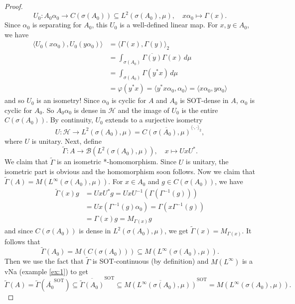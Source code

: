 \documentclass[10pt, a4paper]{article}
\newenvironment{noticeC}{%
  \tcolorbox[%
  notitle,
  empty,
  enhanced,  %
  breakable,
  coltext=black, 
  fontupper=\rmfamily,
  noparskip,
  sharp corners,
  boxrule=-1pt,  %
  frame hidden,
  left=7pt,  %
  right=7pt,
  top=5pt,
  bottom=5pt,
  before skip=2.5ex plus 2pt,
  after skip=2.5ex plus 2pt,
  overlay unbroken and last={%
  },
  ]}
{\endtcolorbox}
\newenvironment{myproof}%
  {\begin{noticeC}\begin{proof}}%
  {\end{proof}\end{noticeC}}
\begin{document}
\begin{myproof}
  $$U_0 : A_0 \alpha_0 \to C(\sigma(A_0)) \subseteq L^2 (\sigma(A_0), \mu),\quad x \alpha_0 \mapsto \Gamma(x).$$
  Since $\alpha_0$ is separating for $A_0$, this $U_0$ is a well-defined linear map.
  For $x, y \in A_0$, we have 
  \begin{align*}
    \langle U_0 (x \alpha_0), U_0 (y \alpha_0) \rangle &= \langle \Gamma(x), \Gamma(y)\rangle_2 \\
    &= \int_{\sigma (A_0)}  \overline{\Gamma(y)} \Gamma(x)\, d\mu\\
    &= \int_{\sigma (A_0)} \Gamma(y^* x)\, d\mu\\
    &= \varphi(y^* x) = \langle y^* x \alpha_0, \alpha_0 \rangle = \langle x \alpha_0, y \alpha_0\rangle
  \end{align*}
  and so $U_0$ is an isometry! Since $\alpha_0$ is cyclic for $A$ and $A_0$
  is SOT-dense in $A$, $\alpha_0$ is cyclic for $A_0$.
  So $A_0 \alpha_0$ is dense in $\mathcal{H}$ and the image of $U_0$ is the entire $C(\sigma(A_0))$.
  By continuity, $U_0$ extends to a surjective isometry 
  $$U : \mathcal{H} \to L^2 (\sigma(A_0), \mu) = \overline{C(\sigma(A_0), \mu)}^{\langle \cdot, \cdot \rangle_2},$$
  where $U$ is unitary. Next, define 
  $$\widetilde{\Gamma} : A \to \mathcal{B} (L^2 (\sigma(A_0), \mu)),\quad x \mapsto UxU^*.$$
  We claim that $\widetilde{\Gamma}$ is an isometric *-homomorphism. Since $U$ is unitary, the isometric part is obvious and the homomorphism soon follows.
  Now we claim that $\widetilde{\Gamma} (A) = M(L^\infty (\sigma(A_0), \mu))$.
  For $x \in A_0$ and $g \in C(\sigma(A_0))$, we have 
  \begin{align*}
    \widetilde{\Gamma} (x) g &= UxU^* g = U x U^{-1} (\Gamma (\Gamma^{-1} (g)))\\
    &= U x (\Gamma^{-1} (g)\alpha_0)= \Gamma (x \Gamma^{-1} (g))\\ 
    &= \Gamma(x) g = M_{\Gamma(x)} g
  \end{align*}
  and since $C(\sigma (A_0))$ is dense in $L^2 (\sigma(A_0), \mu)$, we get $\widetilde{\Gamma}(x) = M_{\Gamma(x)}$.
  It follows that 
  $$\widetilde{\Gamma} (A_0) = M(C(\sigma (A_0))) \subseteq M(L^\infty (\sigma(A_0), \mu)).$$
  Then we use the fact that $\widetilde{\Gamma}$ is SOT-continuous (by definition) and $M(L^\infty)$ is a vNa (example \ref{ex:1}) to get
  $$\widetilde{\Gamma} (A) = \widetilde{\Gamma} (\overline{A_0} ^{\mathrm{SOT}}) \subseteq \overline{\widetilde{\Gamma} (A_0)}^{\mathrm{SOT}} \subseteq \overline{M(L^\infty (\sigma(A_0), \mu))}^{\mathrm{SOT}} = M(L^\infty (\sigma(A_0), \mu)).$$

\end{myproof}
\end{document}
